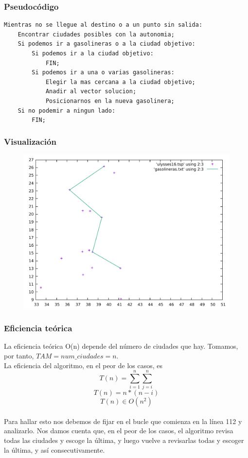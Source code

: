 \documentclass[11pt,a4paper]{article} %
\begin{document}
\subsubsection{Pseudocódigo}

\begin{lstlisting}
Mientras no se llegue al destino o a un punto sin salida:
	Encontrar ciudades posibles con la autonomia;
	Si podemos ir a gasolineras o a la ciudad objetivo:
		Si podemos ir a la ciudad objetivo:
			FIN;
		Si podemos ir a una o varias gasolineras:
			Elegir la mas cercana a la ciudad objetivo;
			Anadir al vector solucion;
			Posicionarnos en la nueva gasolinera;
	Si no podemir a ningun lado:
		FIN;
\end{lstlisting}



\subsubsection{Visualización}
\begin{figure}[H]
	\centering
	\includegraphics[width=13cm]{data/graphics/gasolineras/gasolineras.pdf}
\end{figure}

\subsubsection{Eficiencia teórica}
La eficiencia teórica O(n) depende del número de ciudades que hay. Tomamos, por tanto, $TAM = num\_ciudades = n$.\\

La eficiencia del algoritmo, en el peor de los casos, es 
$$T(n) = \sum_{i=1}^{n}\sum_{j=i}^{n}$$
$$T(n) = n*(n-i)$$
$$T(n) \in O(n^2)$$\\

Para hallar esto nos debemos de fijar en el bucle que comienza en la línea 112 y analizarlo. Nos damos cuenta que, en el peor de los casos, el algoritmo revisa todas las ciudades y escoge la última, y luego vuelve a revisarlas todas y escoger la última, y así consecutivamente.



\end{document}
